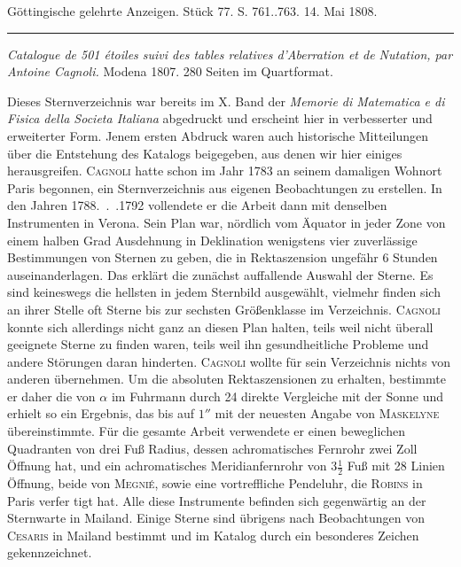 \clearpage
{}
\hypertarget{native-501-lower}{}\label{native-501-lower}
\begin{center}
\small Göttingische gelehrte Anzeigen. Stück 77. S. 761..763. 14. Mai 1808.\\[3pt]
\rule{.72\linewidth}{.3pt}
\end{center}

\emph{Catalogue de \textup{501} étoiles suivi des tables relatives d'Aberration et de Nutation, par Antoine Cagnoli.} Modena 1807. 280 Seiten im Quartformat.

Dieses Sternverzeichnis war bereits im X. Band der \emph{Memorie di Matematica e di Fisica della Societa Italiana} abgedruckt und erscheint hier in verbesserter und erweiterter Form. Jenem ersten Abdruck waren auch historische Mitteilungen über die Entstehung des Katalogs beigegeben, aus denen wir hier einiges herausgreifen. \textsc{Cagnoli} hatte schon im Jahr 1783 an seinem damaligen Wohnort Paris begonnen, ein Sternverzeichnis aus eigenen Beobachtungen zu erstellen. In den Jahren 1788\mbox{. . .}1792 vollendete er die Arbeit dann mit denselben Instrumenten in Verona. Sein Plan war, nördlich vom Äquator in jeder Zone von einem halben Grad Ausdehnung in Deklination wenigstens vier zuverlässige Bestimmungen von Sternen zu geben, die in Rektaszension ungefähr 6 Stunden auseinanderlagen. Das erklärt die zunächst auffallende Auswahl der Sterne. Es sind keineswegs die hellsten in jedem Sternbild ausgewählt, vielmehr finden sich an ihrer Stelle oft Sterne bis zur sechsten Größenklasse im Verzeichnis. \textsc{Cagnoli} konnte sich allerdings nicht ganz an diesen Plan halten, teils weil nicht überall geeignete Sterne zu finden waren, teils weil ihn gesundheitliche Probleme und andere Störungen daran hinderten. \textsc{Cagnoli} wollte für sein Verzeichnis nichts von anderen übernehmen. Um die absoluten Rektaszensionen zu erhalten, bestimmte er daher die von $\alpha$ im Fuhrmann durch 24 direkte Vergleiche mit der Sonne und erhielt so ein Ergebnis, das bis auf $1''$ mit der neuesten Angabe von \textsc{Maskelyne} übereinstimmte. Für die gesamte Arbeit verwendete er einen beweglichen Quadranten von drei Fuß Radius, dessen achromatisches Fernrohr zwei Zoll Öffnung hat, und ein achromatisches Meridianfernrohr von 3$\frac{1}{2}$ Fuß mit 28 Linien Öffnung, beide von \textsc{Megnié}, sowie eine vortreffliche Pendeluhr, die \textsc{Robins} in Paris verfer%
%
tigt hat. Alle diese Instrumente befinden sich gegenwärtig an der Sternwarte in Mailand. Einige Sterne sind übrigens nach Beobachtungen von \textsc{Cesaris} in Mailand bestimmt und im Katalog durch ein besonderes Zeichen gekennzeichnet.

